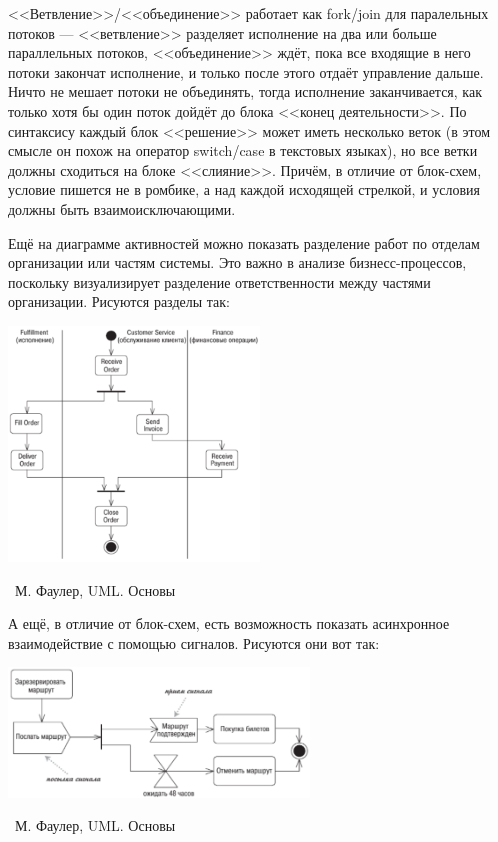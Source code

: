 \documentclass[a5paper]{article}
\newcommand{\attribution}[1] {
    \vspace{-4mm}\begin{flushright}\begin{scriptsize}%
    {\textcopyright\, #1}\end{scriptsize}\end{flushright}
}
\begin{document}
<<Ветвление>>/<<объединение>> работает как fork/join для паралельных потоков --- <<ветвление>> разделяет исполнение на два или больше параллельных потоков, <<объединение>> ждёт, пока все входящие в него потоки закончат исполнение, и только после этого отдаёт управление дальше. Ничто не мешает потоки не объединять, тогда исполнение заканчивается, как только хотя бы один поток дойдёт до блока <<конец деятельности>>. По синтаксису каждый блок <<решение>> может иметь несколько веток (в этом смысле он похож на оператор switch/case в текстовых языках), но все ветки должны сходиться на блоке <<слияние>>. Причём, в отличие от блок-схем, условие пишется не в ромбике, а над каждой исходящей стрелкой, и условия должны быть взаимоисключающими.

Ещё на диаграмме активностей можно показать разделение работ по отделам организации или частям системы. Это важно в анализе бизнесс-процессов, поскольку визуализирует разделение ответственности между частями организации. Рисуются разделы так:

\begin{center}
    \includegraphics[width=0.5\textwidth]{activitySwimlanes.png}
    \attribution{М. Фаулер, UML. Основы}
\end{center}

А ещё, в отличие от блок-схем, есть возможность показать асинхронное взаимодействие с помощью сигналов. Рисуются они вот так:

\begin{center}
    \includegraphics[width=0.6\textwidth]{activitySignals.png}
    \attribution{М. Фаулер, UML. Основы}
\end{center}
\end{document}
